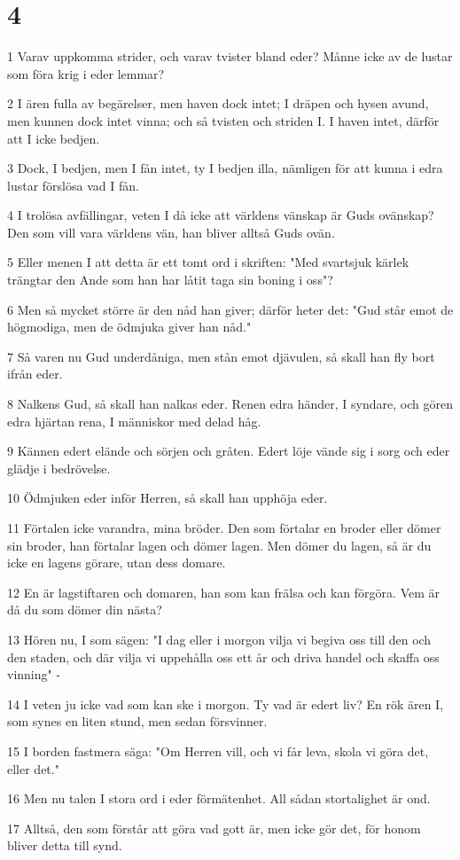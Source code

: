 \chapter{4}

\par 1 Varav uppkomma strider, och varav tvister bland eder? Månne icke av de lustar som föra krig i eder lemmar?
\par 2 I ären fulla av begärelser, men haven dock intet; I dräpen och hysen avund, men kunnen dock intet vinna; och så tvisten och striden I. I haven intet, därför att I icke bedjen.
\par 3 Dock, I bedjen, men I fån intet, ty I bedjen illa, nämligen för att kunna i edra lustar förslösa vad I fån.
\par 4 I trolösa avfällingar, veten I då icke att världens vänskap är Guds ovänskap? Den som vill vara världens vän, han bliver alltså Guds ovän.
\par 5 Eller menen I att detta är ett tomt ord i skriften: "Med svartsjuk kärlek trängtar den Ande som han har låtit taga sin boning i oss"?
\par 6 Men så mycket större är den nåd han giver; därför heter det: "Gud står emot de högmodiga, men de ödmjuka giver han nåd."
\par 7 Så varen nu Gud underdåniga, men stån emot djävulen, så skall han fly bort ifrån eder.
\par 8 Nalkens Gud, så skall han nalkas eder. Renen edra händer, I syndare, och gören edra hjärtan rena, I människor med delad håg.
\par 9 Kännen edert elände och sörjen och gråten. Edert löje vände sig i sorg och eder glädje i bedrövelse.
\par 10 Ödmjuken eder inför Herren, så skall han upphöja eder.
\par 11 Förtalen icke varandra, mina bröder. Den som förtalar en broder eller dömer sin broder, han förtalar lagen och dömer lagen. Men dömer du lagen, så är du icke en lagens görare, utan dess domare.
\par 12 En är lagstiftaren och domaren, han som kan frälsa och kan förgöra. Vem är då du som dömer din nästa?
\par 13 Hören nu, I som sägen: "I dag eller i morgon vilja vi begiva oss till den och den staden, och där vilja vi uppehålla oss ett år och driva handel och skaffa oss vinning" -
\par 14 I veten ju icke vad som kan ske i morgon. Ty vad är edert liv? En rök ären I, som synes en liten stund, men sedan försvinner.
\par 15 I borden fastmera säga: "Om Herren vill, och vi får leva, skola vi göra det, eller det."
\par 16 Men nu talen I stora ord i eder förmätenhet. All sådan stortalighet är ond.
\par 17 Alltså, den som förstår att göra vad gott är, men icke gör det, för honom bliver detta till synd.

